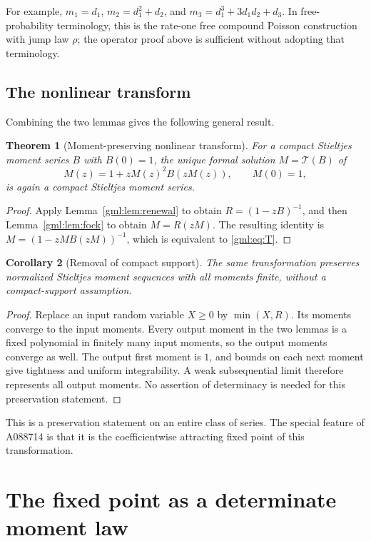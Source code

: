 \documentclass[11pt]{article}
\numberwithin{equation}{section}
\newtheorem{theorem}{Theorem}[section]
\newtheorem{corollary}[theorem]{Corollary}
\theoremstyle{definition}
\theoremstyle{remark}
\newcommand{\T}{\mathcal T}
\begin{document}
For example, $m_1=d_1$, $m_2=d_1^2+d_2$, and
$m_3=d_1^3+3d_1d_2+d_3$. In free-probability terminology, this is the
rate-one free compound Poisson construction with jump law $\rho$; the
operator proof above is sufficient without adopting that terminology.

\subsection{The nonlinear transform}
Combining the two lemmas gives the following general result.
\begin{theorem}[Moment-preserving nonlinear transform]\label{gml:thm:transform}
For a compact Stieltjes moment series $B$ with $B(0)=1$, the unique formal
solution $M=\T(B)$ of
\begin{equation}\label{gml:eq:T}
 M(z)=1+zM(z)^2B(zM(z)),\qquad M(0)=1,
\end{equation}
is again a compact Stieltjes moment series.
\end{theorem}
\begin{proof}
Apply Lemma~\ref{gml:lem:renewal} to obtain $R=(1-zB)^{-1}$, and then
Lemma~\ref{gml:lem:fock} to obtain $M=R(zM)$. The resulting identity is
$M=(1-zMB(zM))^{-1}$, which is equivalent to \eqref{gml:eq:T}.
\end{proof}
\begin{corollary}[Removal of compact support]
The same transformation preserves normalized Stieltjes moment sequences
with all moments finite, without a compact-support assumption.
\end{corollary}
\begin{proof}
Replace an input random variable $X\ge0$ by $\min(X,R)$. Its moments
converge to the input moments. Every output moment in the two lemmas is a
fixed polynomial in finitely many input moments, so the output moments
converge as well. The output first moment is $1$, and bounds on each next
moment give tightness and uniform integrability. A weak subsequential
limit therefore represents all output moments. No assertion of determinacy
is needed for this preservation statement.
\end{proof}
This is a preservation statement on an entire class of series. The
special feature of A088714 is that it is the coefficientwise attracting
fixed point of this transformation.

\section{The fixed point as a determinate moment law}\label{gml:sec:limit}
\end{document}
